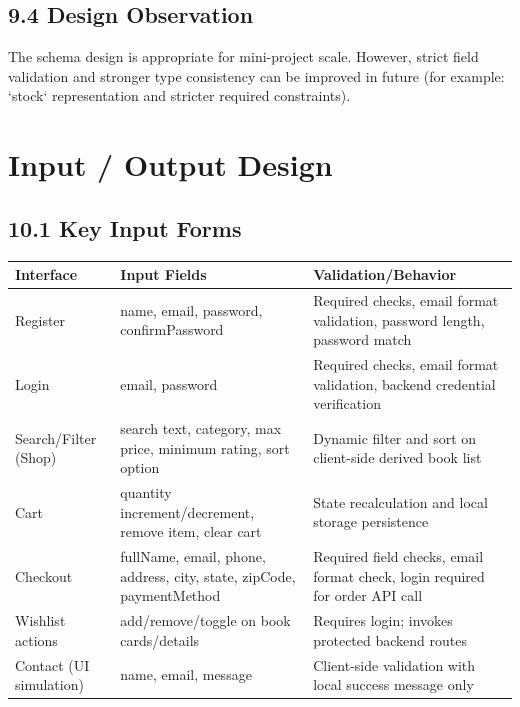 \documentclass[12pt,a4paper]{report}
\begin{document}
\section*{9.4 Design Observation}
The schema design is appropriate for mini-project scale. However, strict field validation and stronger type consistency can be improved in future (for example: `stock` representation and stricter required constraints).

\chapter{Input / Output Design}
\section*{10.1 Key Input Forms}
\begin{longtable}{>{\raggedright\arraybackslash}p{} >{\raggedright\arraybackslash}p{} >{\raggedright\arraybackslash}p{}}
\toprule
\textbf{Interface} & \textbf{Input Fields} & \textbf{Validation/Behavior} \\
\midrule
Register & name, email, password, confirmPassword & Required checks, email format validation, password length, password match \\
Login & email, password & Required checks, email format validation, backend credential verification \\
Search/Filter (Shop) & search text, category, max price, minimum rating, sort option & Dynamic filter and sort on client-side derived book list \\
Cart & quantity increment/decrement, remove item, clear cart & State recalculation and local storage persistence \\
Checkout & fullName, email, phone, address, city, state, zipCode, paymentMethod & Required field checks, email format check, login required for order API call \\
Wishlist actions & add/remove/toggle on book cards/details & Requires login; invokes protected backend routes \\
Contact (UI simulation) & name, email, message & Client-side validation with local success message only \\
\bottomrule
\end{longtable}
\end{document}
